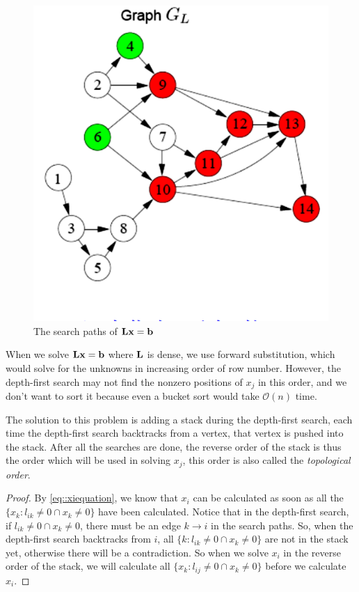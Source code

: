 \begin{exm}
\begin{figure}[H]
        \hfill
        \includegraphics[width=0.49\linewidth]{png/GL2.png}
        \caption{The search paths of ${\mathbf{L}}{\mathbf{x}}=\mathbf{b}$}
        \label{fig::LGL2}
    \end{figure}
\end{exm}

\begin{lem}
    \label{lem::toporder}
    When we solve ${\mathbf{L}}{\mathbf{x}}=\mathbf{b}$ where ${\mathbf{L}}$ is dense, we 
    use forward substitution, which would solve for the 
    unknowns in increasing order of row number. However, the 
    depth-first search may not find the nonzero positions of 
    $x_j$ in this order, and we don't want to sort it because 
    even a bucket sort would take $\mathcal{O}(n)$ time. 

    The solution to this problem is adding a stack during the 
    depth-first search, each time the depth-first search 
    backtracks from a vertex, that vertex is pushed into the 
    stack. After all the searches are done, the reverse order 
    of the stack is thus the order which will be used in 
    solving $x_j$, this order is also called the \textit{
    topological order}.
\end{lem}
\begin{proof}
    By \eqref{eq::xiequation}, we know that $x_i$ can be 
    calculated as soon as all the $\{x_k:l_{ik}\neq 0\cap 
    x_k\neq 0\}$ have been calculated. Notice that in the 
    depth-first search, if $l_{ik}\neq 0\cap x_k\neq 0$, 
    there must be an edge $k\rightarrow i$ in the search paths. 
    So, when the depth-first search backtracks from $i$, all 
    $\{k:l_{ik}\neq 0\cap x_k\neq 0\}$ are not in the stack 
    yet, otherwise there will be a contradiction. So when we 
    solve $x_i$ in the reverse order of the stack, we will 
    calculate all $\{x_k:l_{ij}\neq 0\cap x_k\neq 0\}$ before 
    we calculate $x_i$.
\end{proof}

